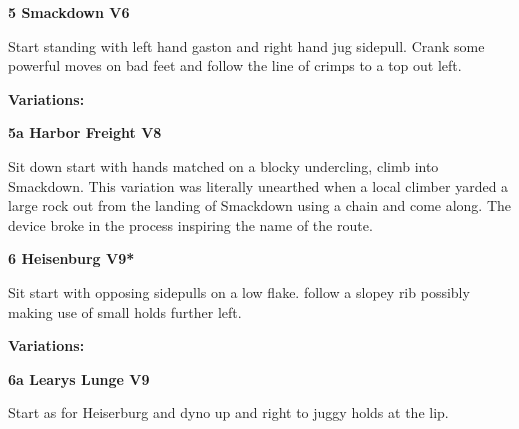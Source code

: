	\begin{multicols}{2}


\needspace{1.5cm}
\label{rt:Smackdown}
\colorbox{RoyalBlue!20}{
\parbox{0.95\linewidth}{
\textbf{
5 Smackdown V6  
}}}

\begin{adjustwidth}{0.5cm}{}			
Start standing with left hand gaston and right hand jug sidepull. Crank some powerful moves on bad feet and follow the line of crimps to a top out left.
\end{adjustwidth}

\begin{adjustwidth}{0.5cm}{}				
\needspace{3cm}
\textbf{Variations:} \newline

\needspace{1.5cm}
\label{vr:Harbor Freight}
\colorbox{Goldenrod!50}{
\parbox{0.95\linewidth}{
\textbf{
5a Harbor Freight V8  
}}}

\begin{adjustwidth}{0.5cm}{}			
Sit down start with hands matched on a blocky undercling, climb into Smackdown. This variation was literally unearthed when a local climber yarded a large rock out from the landing of Smackdown using a chain and come along. The device broke in the process inspiring the name of the route.
\end{adjustwidth}


\end{adjustwidth}


\needspace{1.5cm}
\label{rt:Heisenburg}
\colorbox{Goldenrod!50}{
\parbox{0.95\linewidth}{
\textbf{
6 Heisenburg V9*  
}}}

\begin{adjustwidth}{0.5cm}{}			
Sit start with opposing sidepulls on a low flake. follow a slopey rib possibly making use of small holds further left.
\end{adjustwidth}

\begin{adjustwidth}{0.5cm}{}				
\needspace{3cm}
\textbf{Variations:} \newline

\needspace{1.5cm}
\label{vr:Learys Lunge}
\colorbox{Goldenrod!50}{
\parbox{0.95\linewidth}{
\textbf{
6a Learys Lunge V9  
}}}

\begin{adjustwidth}{0.5cm}{}			
Start as for Heiserburg and dyno up and right to juggy holds at the lip.
\end{adjustwidth}



\end{adjustwidth}
\end{multicols}

